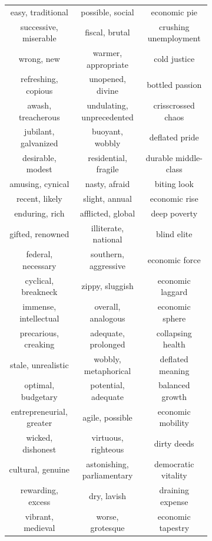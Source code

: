 \documentclass[9pt,twocolumn,twoside,lineno]{pnas-new}
\begin{document}
\begin{figure}
\begin{subfigure}{0.3\textwidth}
\begin{center}
\begin{tabular}{ c | c | c  }
			\tiny easy, traditional & \tiny possible, social & \tiny economic pie\\
			\tiny successive, miserable & \tiny fiscal, brutal & \tiny crushing unemployment\\
			\tiny wrong, new & \tiny warmer, appropriate & \tiny cold justice\\
			\tiny refreshing, copious & \tiny unopened, divine & \tiny bottled passion\\
			\tiny awash, treacherous & \tiny undulating, unprecedented & \tiny crisscrossed chaos\\
			\tiny jubilant, galvanized & \tiny buoyant, wobbly & \tiny deflated pride\\
			\tiny desirable, modest & \tiny residential, fragile & \tiny durable middle-class\\
			\tiny amusing, cynical & \tiny nasty, afraid & \tiny biting look\\
			\tiny recent, likely & \tiny slight, annual & \tiny economic rise\\
			\tiny enduring, rich & \tiny afflicted, global & \tiny deep poverty\\
			\tiny gifted, renowned & \tiny illiterate, national & \tiny blind elite\\
			\tiny federal, necessary & \tiny southern, aggressive & \tiny economic force\\
			\tiny cyclical, breakneck & \tiny zippy, sluggish & \tiny economic laggard\\
			\tiny immense, intellectual & \tiny overall, analogous & \tiny economic sphere\\
			\tiny precarious, creaking & \tiny adequate, prolonged & \tiny collapsing health\\
			\tiny stale, unrealistic & \tiny wobbly, metaphorical & \tiny deflated meaning\\
			\tiny optimal, budgetary & \tiny potential, adequate & \tiny balanced growth\\
			\tiny entrepreneurial, greater & \tiny agile, possible & \tiny economic mobility\\
			\tiny wicked, dishonest & \tiny virtuous, righteous & \tiny dirty deeds\\
			\tiny cultural, genuine & \tiny astonishing, parliamentary & \tiny democratic vitality\\
			\tiny rewarding, excess & \tiny dry, lavish & \tiny draining expense\\
			\tiny vibrant, medieval & \tiny worse, grotesque & \tiny economic tapestry\\

\end{tabular}
\end{center}
\end{subfigure}
\end{figure}
\end{document}

